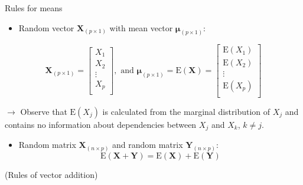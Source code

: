 \documentclass[ignorenonframetext,]{beamer}
\providecommand{\tightlist}{%
  \setlength{\itemsep}{0pt}\setlength{\parskip}{0pt}}
\begin{document}
\begin{frame}

\begin{block}{Rules for means}

\begin{itemize}
\tightlist
\item
  Random vector \(\boldsymbol{X}_{(p\times 1)}\) with mean vector
  \(\boldsymbol{\mu}_{(p\times 1)}\):
\end{itemize}

\[\boldsymbol{X}_{(p\times 1)}=\left[ \begin{array}{c}X_1\\ X_2\\ \vdots\\ X_p\\ \end{array}\right], \text{ and }\boldsymbol{\mu}_{(p \times 1)}=\text{E}(\boldsymbol{X})=\left[ \begin{array}{c}\text{E}(X_1)\\ \text{E}(X_2)\\ \vdots\\ \text{E}(X_p)\\ \end{array}\right]\]

\(\rightarrow\) Observe that \(\text{E}(X_j)\) is calculated from the
marginal distribution of \(X_j\) and contains no information about
dependencies between \(X_{j}\) and \(X_k\), \(k\neq j\).

\begin{itemize}
\tightlist
\item
  Random matrix \(\boldsymbol{X}_{(n\times p)}\) and random matrix
  \(\boldsymbol{Y}_{(n\times p)}\):
  \[\text{E}(\boldsymbol{X}+\boldsymbol{Y})=\text{E}(\boldsymbol{X})+\text{E}(\boldsymbol{Y})\]
\end{itemize}

(Rules of vector addition)

\end{block}

\end{frame}
\end{document}

